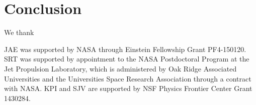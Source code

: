 \documentclass[twocolumn,aps,prd,superscriptaddress]{revtex4-1}
\begin{document}
\section{Conclusion}
\label{sec:conclusion}


\acknowledgments
We thank

JAE was supported by NASA through Einstein Fellowship Grant PF4-150120. 
SRT was supported by appointment to the NASA Postdoctoral Program 
at the Jet Propulsion Laboratory, which is administered by Oak Ridge Associated Universities 
and the Universities Space Research Association through a contract with NASA. 
KPI and SJV are supported by NSF Physics Frontier Center Grant 1430284.




\end{document}
